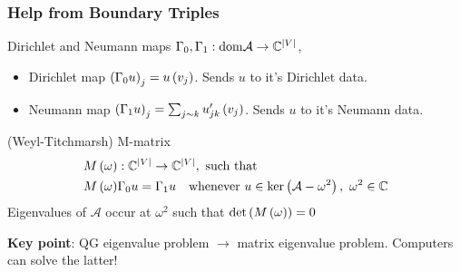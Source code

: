\documentclass{beamer}
\begin{document}
\begin{frame}
	\frametitle{Help from Boundary Triples}

	\begin{block}{Dirichlet and Neumann maps}
		$\Gamma_0, \Gamma_1 : \mathrm{dom}\mathcal{A} \rightarrow \mathbb{C}^{\lvert V \rvert}$,
		\begin{itemize}
			\item Dirichlet map $\left( \Gamma_0 u \right)_j = u\left( v_j \right)$. Sends $u$ to it's Dirichlet data.
			\item Neumann map $\left( \Gamma_1 u \right)_j = \sum_{j\sim k}u_{jk}'\left( v_j \right)$. Sends $u$ to it's Neumann data.
		\end{itemize}
	\end{block}
	
	\begin{block}{	(Weyl-Titchmarsh) M-matrix}
		\begin{align*}
			M\left( \omega \right) &:\mathbb{C}^{\lvert V \rvert} \rightarrow\mathbb{C}^{\lvert V \rvert}, \text{ such that } \\
			M\left( \omega \right) &\Gamma_0 u = \Gamma_1 u \quad
			\text{whenever } u\in\mathrm{ker}\left( \mathcal{A}-\omega^2 \right), \ \omega^2\in\mathbb{C}
		\end{align*}
		Eigenvalues of $\mathcal{A}$ occur at $\omega^2$ such that $\mathrm{det}\left( M\left( \omega \right) \right)=0$
	\end{block}

	\textbf{Key point}: QG eigenvalue problem $\rightarrow$ matrix eigenvalue problem.
	Computers can solve the latter!
\end{frame}
\end{document}
